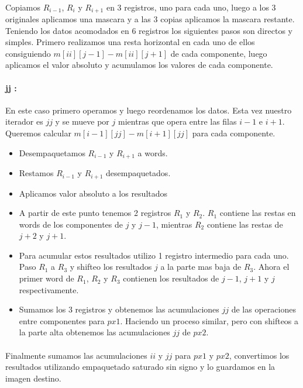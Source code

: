 \documentclass[a4paper]{article}
\begin{document}
\paragraph{} Copiamos $R_{i-1}$, $R_i$ y $R_{i+1}$ en 3 registros, uno para cada uno, luego a los 3 originales aplicamos una mascara y a las 3 copias aplicamos la mascara restante. Teniendo los datos acomodados en 6 registros los siguientes pasos son directos y simples. Primero realizamos una resta horizontal en cada uno de ellos consiguiendo $m[ii][j-1] - m[ii][j+1]$ de cada componente, luego aplicamos el valor absoluto y acumulamos los valores de cada componente.

\paragraph{jj :}En este caso primero operamos y luego reordenamos los datos. Esta vez nuestro iterador es $jj$ y se mueve por $j$ mientras que opera entre las filas $i-1$ e $i+1$. Queremos calcular $m[i-1][jj] - m[i+1][jj]$ para cada componente.

\begin{itemize}
	\item Desempaquetamos $R_{i-1}$ y $R_{i+1}$ a words.
	\item Restamos $R_{i-1}$ y $R_{i+1}$ desempaquetados.
	\item Aplicamos valor absoluto a los resultados
	\item A partir de este punto tenemos 2 registros $R_1$ y $R_2$. $R_1$ contiene las restas en words de los componentes de $j$ y $j-1$, mientras $R_2$ contiene las restas de $j+2$ y $j+1$.
	\item Para acumular estos resultados utilizo 1 registro intermedio para cada uno. Paso $R_1$ a $R_3$ y shifteo los resultados $j$ a la parte mas baja de $R_3$. Ahora el primer word de $R_1$, $R_2$ y $R_3$ contienen los resultados de $j-1$, $j+1$ y $j$ respectivamente.
	\item Sumamos los 3 registros y obtenemos las acumulaciones $jj$ de las operaciones entre componentes para $px1$. Haciendo un proceso similar, pero con shifteos a la parte alta obtenemos las acumulaciones $jj$ de $px2$. 
\end{itemize}

\paragraph{} Finalmente sumamos las acumulaciones $ii$ y $jj$ para $px1$ y $px2$, convertimos los resultados utilizando empaquetado saturado sin signo y lo guardamos en la imagen destino.
\end{document}
